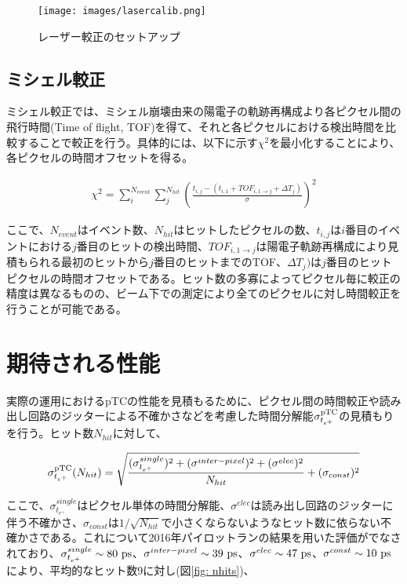 \documentclass[Yonemoto_master.tex]{subfiles}
\begin{document}
\begin{figure}[h]
\begin{center}
\texttt{[image: images/lasercalib.png]}
\caption{レーザー較正のセットアップ}
\label{fig: lasercalib}
\end{center}
\end{figure}

\subsection{ミシェル較正}
ミシェル較正では、ミシェル崩壊由来の陽電子の軌跡再構成より各ピクセル間の飛行時間(Time of flight, TOF)を得て、それと各ピクセルにおける検出時間を比較することで較正を行う。具体的には、以下に示す$\chi^2$を最小化することにより、各ピクセルの時間オフセットを得る。

\begin{align}
\chi^2 = \sum^{N_{event}}_{i} \sum^{N_{hit}}_{j} \left(\frac{t_{i,j} - (t_{i,1} + TOF_{i,1\to j} + \Delta{T_j}) }{\sigma} \right)^2
\end{align}

ここで、$N_{event}$はイベント数、$N_{hit}$はヒットしたピクセルの数、$t_{i,j}$は$i$番目のイベントにおける$j$番目のヒットの検出時間、$TOF_{i,1\to j}$は陽電子軌跡再構成により見積もられる最初のヒットから$j$番目のヒットまでのTOF、$\Delta{T_j})$は$j$番目のヒットピクセルの時間オフセットである。ヒット数の多寡によってピクセル毎に較正の精度は異なるものの、ビーム下での測定により全てのピクセルに対し時間較正を行うことが可能である。

\section{期待される性能}

実際の運用におけるpTCの性能を見積もるために、ピクセル間の時間較正や読み出し回路のジッターによる不確かさなどを考慮した時間分解能$\sigma_{t_{e^+}}^{\rm pTC}$の見積もりを行う。ヒット数$N_{hit}$に対して、

\begin{align}
\sigma_{t_{e^+}}^{\rm pTC} (N_{hit}) = \sqrt{\frac{(\sigma_{t_{e^+}}^{single})^2 + (\sigma^{inter-pixel})^2 + (\sigma^{elec})^2}{N_{hit}} + (\sigma_{const})^2}
\end{align}

ここで、$\sigma_{t_{e^+}}^{single}$はピクセル単体の時間分解能、$\sigma^{elec}$は読み出し回路のジッターに伴う不確かさ、$\sigma_{const}$は$1/\sqrt{N_{hit}}$で小さくならないようなヒット数に依らない不確かさである。これについて2016年パイロットランの結果を用いた評価が\cite{nakao}でなされており、$\sigma_{t_{e^+}}^{single} \sim 80 \ {\rm ps}$、$\sigma^{inter-pixel} \sim 39 \ {\rm ps}$、$\sigma^{elec} \sim 47 \ {\rm ps}$、$\sigma^{const} \sim 10 \ {\rm ps}$により、平均的なヒット数9に対し(図\ref{fig: nhits})、
\end{document}
